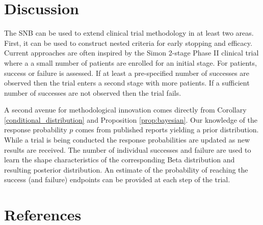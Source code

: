 \documentclass[review]{elsarticle}
\begin{document}
\section{Discussion}

The SNB can be used to extend clinical trial methodology
in at least two areas. First, it can be used to construct nested criteria
for early stopping and efficacy. Current approaches are often inspired by
the Simon 2-stage Phase II clinical trial \cite{Simon1989} where a
a small number of patients are enrolled for an initial stage. For patients,
success or failure is assessed. If at least a pre-specified number of
successes are observed then the trial enters a second stage with more
patients. If a sufficient number of successes are not observed then the
trial fails. 


A second avenue for methodological innovation comes directly from
Corollary \ref{conditional_distribution} and Proposition \ref{prop:bayesian}.
Our knowledge of the response probability $p$ comes from published reports
yielding a prior distribution.
While a trial is being conducted the response probabilities are 
updated as new results are received. The number of individual successes
and failure are used to learn the shape characteristics of the corresponding
Beta distribution and resulting posterior
distribution. An estimate of the probability of reaching the success (and
failure) endpoints can be provided at each step of the trial.



\section*{References}


\end{document}
